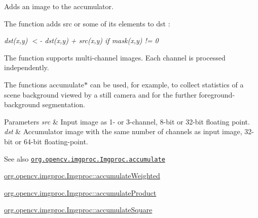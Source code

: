 Adds an image to the accumulator.

The function adds {\ttfamily src} or some of its elements to {\ttfamily dst} \+:

{\itshape dst(x,y) $<$-\/ dst(x,y) + src(x,y) if mask(x,y) != 0}

The function supports multi-\/channel images. Each channel is processed independently.

The functions {\ttfamily accumulate$\ast$} can be used, for example, to collect statistics of a scene background viewed by a still camera and for the further foreground-\/background segmentation.


\begin{DoxyParams}{Parameters}
{\em src} & Input image as 1-\/ or 3-\/channel, 8-\/bit or 32-\/bit floating point. \\
\hline
{\em dst} & Accumulator image with the same number of channels as input image, 32-\/bit or 64-\/bit floating-\/point.\\
\hline
\end{DoxyParams}
\begin{DoxySeeAlso}{See also}
\href{http://docs.opencv.org/modules/imgproc/doc/motion_analysis_and_object_tracking.html#accumulate}{\tt org.\+opencv.\+imgproc.\+Imgproc.\+accumulate} 

\mbox{\hyperlink{classorg_1_1opencv_1_1imgproc_1_1_imgproc_a67077201750b8f44b2a8ce7483f58883}{org.\+opencv.\+imgproc.\+Imgproc\+::accumulate\+Weighted}} 

\mbox{\hyperlink{classorg_1_1opencv_1_1imgproc_1_1_imgproc_a1be426770d204691d4f181c5ed663f7a}{org.\+opencv.\+imgproc.\+Imgproc\+::accumulate\+Product}} 

\mbox{\hyperlink{classorg_1_1opencv_1_1imgproc_1_1_imgproc_a5de5a552dbd44bbc411de004bc11337b}{org.\+opencv.\+imgproc.\+Imgproc\+::accumulate\+Square}} 
\end{DoxySeeAlso}
\mbox{\label{classorg_1_1opencv_1_1imgproc_1_1_imgproc_a1be426770d204691d4f181c5ed663f7a}} 
